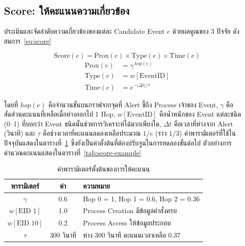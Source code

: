 \subsection{Score: ให้คะแนนความเกี่ยวข้อง}
ประเมินและจัดลำดับความเกี่ยวข้องของแต่ละ Candidate Event $e$ ด้วยผลคูณของ 3 ปัจจัย ดังสมการ~\eqref{eq:score}

\begin{equation}\label{eq:score}
\mathrm{Score}(e) = \mathrm{Prox}(e) \times \mathrm{Type}(e) \times \mathrm{Time}(e)
\end{equation}
\begin{align}
\mathrm{Prox}(e) &= \gamma^{\,hop(e)} \\
\mathrm{Type}(e) &= w[\mathrm{EventID}] \\
\mathrm{Time}(e) &= e^{-|\Delta t|/\tau}
\end{align}

\noindent
โดยที่ $hop(e)$ คือจำนวนขั้นบนกราฟจากจุดที่ Alert ชี้ถึง Process เจ้าของ Event,
$\gamma$ คือสัดส่วนคะแนนที่เหลือเมื่อห่างออกไป 1 Hop,
$w[\mathrm{EventID}]$ คือน้ำหนักของ Event แต่ละชนิด (0--1) ที่บอกว่า Event ชนิดนั้นช่วยการวิเคราะห์ได้มากเพียงใด,
$\Delta t$ คือเวลาที่ห่างจาก Alert (วินาที) และ $\tau$ คือช่วงเวลาที่คะแนนลดลงเหลือประมาณ $1/e$ (ราว $1/3$)
ค่าพารามิเตอร์ที่ใช้ในปัจจุบันแสดงในตารางที่~\ref{tab:score-param}
ซึ่งยังเป็นค่าตั้งต้นที่ต้องปรับจูนในการทดลองขั้นต่อไป
ตัวอย่างการคำนวณคะแนนแสดงในตารางที่~\ref{tab:score-example}

\begin{table}[ht]
  \centering
  \caption{ค่าพารามิเตอร์ตั้งต้นของการให้คะแนน}
  \label{tab:score-param}
  \begin{tabular}{|c|c|l|}
    \hline
    \textbf{พารามิเตอร์} & \textbf{ค่า} & \textbf{ความหมาย} \\ \hline
    $\gamma$ & 0.6 & Hop 0 = 1, Hop 1 = 0.6, Hop 2 = 0.36 \\ \hline
    $w[\text{EID 1}]$ & 1.0 & Process Creation มีข้อมูลคำสั่งครบ \\ \hline
    $w[\text{EID 10}]$ & 0.2 & Process Access ให้ข้อมูลประกอบ \\ \hline
    $\tau$ & 300 วินาที & ห่าง 300 วินาที คะแนนเวลาเหลือ 0.37 \\ \hline
  \end{tabular}
\end{table}

